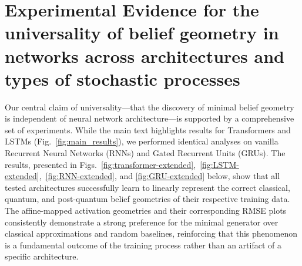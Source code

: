 \documentclass[prx,nofootinbib,onecolumn,showkeys,groupaddress,preprintnumbers,floatfix,
superscriptaddress]{revtex4-1}
\begin{document}


\section{Experimental Evidence for the universality of belief geometry in networks across architectures and types of stochastic processes}
\label{app:extended-figs}

Our central claim of universality—that the discovery of minimal belief geometry is independent of neural network architecture—is supported by a comprehensive set of experiments. While the main text highlights results for Transformers and LSTMs (Fig.~\ref{fig:main_results}), we performed identical analyses on vanilla Recurrent Neural Networks (RNNs) and Gated Recurrent Units (GRUs). The results, presented in Figs.~\ref{fig:transformer-extended},~\ref{fig:LSTM-extended},~\ref{fig:RNN-extended}, and \ref{fig:GRU-extended} below, show that all tested architectures successfully learn to linearly represent the correct classical, quantum, and post-quantum belief geometries of their respective training data. The affine-mapped activation geometries and their corresponding RMSE plots consistently demonstrate a strong preference for the minimal generator over classical approximations and random baselines, reinforcing that this phenomenon is a fundamental outcome of the training process rather than an artifact of a specific architecture.
\end{document}
